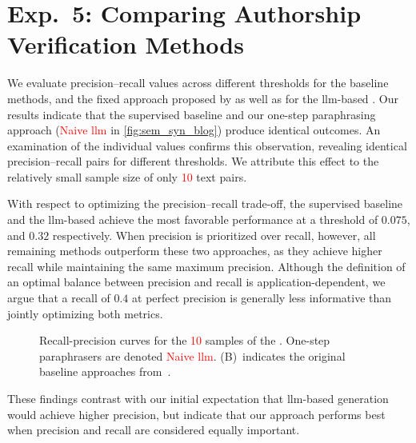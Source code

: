 \section{Exp.\ 5: Comparing Authorship Verification Methods}%
\label{subsec:imp_gen_res}

We evaluate precision–recall values across different thresholds for the baseline methods, and the fixed approach proposed by \citet{koppel_determining_2014} as well as for the \ac{llm}-based \impAppr{}.
Our results indicate that the supervised baseline and our one-step paraphrasing approach (\textcolor{red}{Naive \ac{llm}} in \autoref{fig:sem_syn_blog}) produce identical outcomes.
An examination of the individual values confirms this observation, revealing identical precision–recall pairs for different thresholds.
We attribute this effect to the relatively small sample size of only \textcolor{red}{10} text pairs.

With respect to optimizing the precision–recall trade-off, the supervised baseline and the \ac{llm}-based \impAppr{} achieve the most favorable performance at a threshold of $0.075$, and $0.32$ respectively.
When precision is prioritized over recall, however, all remaining methods outperform these two approaches, as they achieve higher recall while maintaining the same maximum precision.
Although the definition of an optimal balance between precision and recall is application-dependent, we argue that a recall of $0.4$ at perfect precision is generally less informative than jointly optimizing both metrics.

\begin{figure}[htbp]
    \centering
    
    \caption[Recall-precision curves for the \dataStudent{}.]{Recall-precision curves for the \textcolor{red}{10} samples of the \dataStudent{}. 
    One-step paraphrasers are denoted \textcolor{red}{Naive \ac{llm}}.
    (B)~indicates the original baseline approaches from~\citep{koppel_determining_2014}.
    }
    \label{fig:sem_syn_blog}
\end{figure}

These findings contrast with our initial expectation that \ac{llm}-based \imp{} generation would achieve higher precision, but indicate that our approach performs best when precision and recall are considered equally important.
